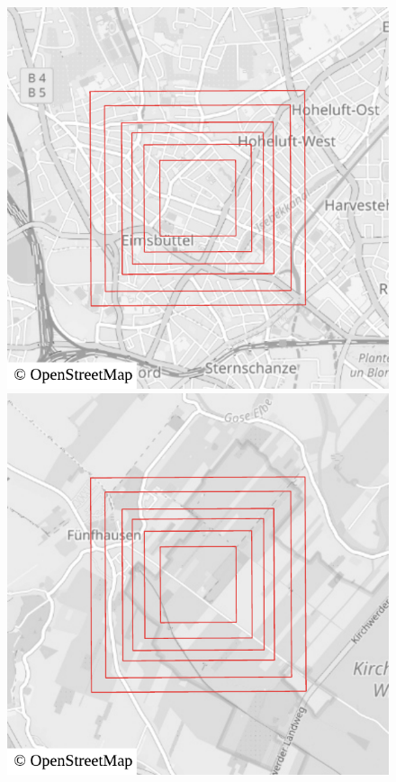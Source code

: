 			\begin{figure}[h!]
				\centering
				\begin{minipage}[t]{.38\textwidth}
					\begin{figcenter}
						\includegraphics[width=\textwidth]{images/qgis-overview-city-rural_city}
					\end{figcenter}
				\end{minipage}
				\hspace{0.04\textwidth}
				\begin{minipage}[t]{.38\textwidth}
					\begin{figcenter}
						\includegraphics[width=\textwidth]{images/qgis-overview-city-rural_rural}

\end{figcenter}
\end{minipage}
\end{figure}
